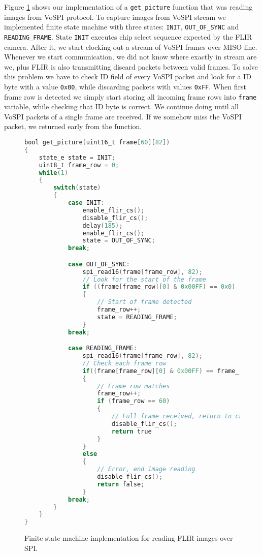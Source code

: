 Figure \ref{vospi_code} shows our implementation of a \verb|get_picture| function that was reading images from VoSPI protocol.
To capture images from VoSPI stream we implemented finite state machine with three states: \verb|INIT|, \verb|OUT_OF_SYNC| and \verb|READING_FRAME|.
State \verb|INIT| executes chip select sequence expected by the FLIR camera.
After it, we start clocking out a stream of VoSPI frames over MISO line.
Whenever we start communication, we did not know where exactly in stream are we, plus FLIR is also transmitting discard packets between valid frames.
To solve this problem we have to check ID field of every VoSPI packet and look for a ID byte with a value \verb|0x00|, while discarding packets with values \verb|0xFF|.
When first frame row is detected we simply start storing all incoming frame rows into \verb|frame| variable, while checking that ID byte is correct.
We continue doing until all VoSPI packets of a single frame are received.
If we somehow miss the VoSPI packet, we returned early from the function.

\lstset{style=mystyle}
\begin{figure}[ht] 
\begin{lstlisting}[language=C]
bool get_picture(uint16_t frame[60][82])
{
    state_e state = INIT;
    uint8_t frame_row = 0;
    while(1) 
    {
        switch(state) 
        {
            case INIT:
                enable_flir_cs();
                disable_flir_cs();
                delay(185);
                enable_flir_cs();
                state = OUT_OF_SYNC;
            break;

            case OUT_OF_SYNC:
                spi_read16(frame[frame_row], 82);
                // Look for the start of the frame
                if ((frame[frame_row][0] & 0x00FF) == 0x0) 
                {
                    // Start of frame detected
                    frame_row++;
                    state = READING_FRAME;
                }
            break;

            case READING_FRAME:
                spi_read16(frame[frame_row], 82);
                // Check each frame row
                if((frame[frame_row][0] & 0x00FF) == frame_row) 
                {
                    // Frame row matches
                    frame_row++;
                    if (frame_row == 60) 
                    {
                        // Full frame received, return to caller
                        disable_flir_cs();
                        return true
                    }
                }
                else 
                {
                    // Error, end image reading
                    disable_flir_cs();
                    return false;
                }
            break;
        }
    }
}
\end{lstlisting}
    \caption{ Finite state machine implementation for reading FLIR images over SPI.}
    \label{vospi_code}
\end{figure}

